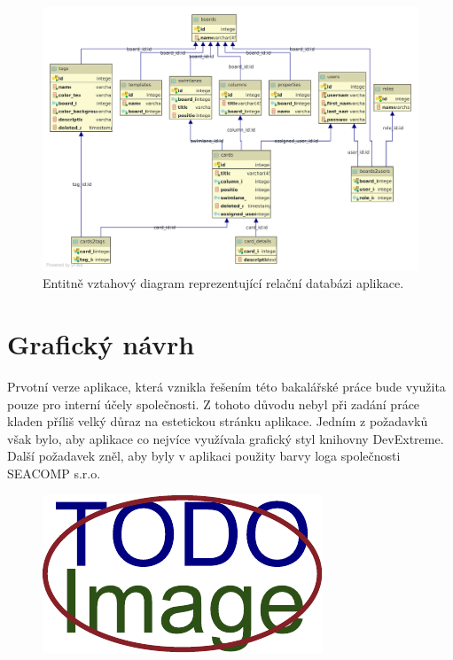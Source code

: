 \begin{figure}[H]
	\centering
	\label{img:erd}
	\includegraphics[width=\textwidth]{obrazky-figures/erd.pdf}
	\caption{Entitně vztahový diagram reprezentující relační databázi aplikace.}
\end{figure}


\section{Grafický návrh}
Prvotní verze aplikace, která vznikla řešením této bakalářské práce bude využita pouze pro interní účely společnosti. Z tohoto důvodu nebyl při zadání práce kladen příliš velký důraz na estetickou stránku aplikace. Jedním z požadavků však bylo, aby aplikace co nejvíce využívala grafický styl knihovny DevExtreme. Další požadavek zněl, aby byly v aplikaci použity barvy loga společnosti SEACOMP s.r.o.

\begin{figure}[H]
	\centering
	\includegraphics[width=\textwidth]{obrazky-figures/placeholder.pdf}
\end{figure}


